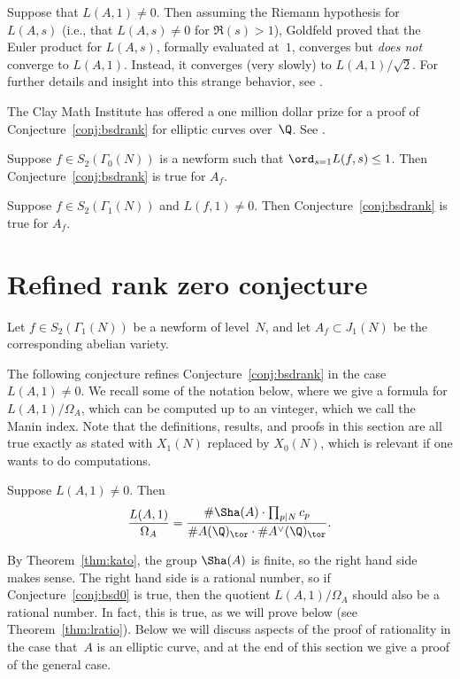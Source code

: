 \documentclass{report}
\begin{document}
\begin{remark}
  Suppose that $L(A,1)\neq 0$.  Then assuming the Riemann hypothesis
  for $L(A,s)$ (i.e., that $L(A,s)\neq 0$ for $\Re(s)>1$), Goldfeld
  \cite{goldfeld:L1} proved that the Euler product for $L(A,s)$,
  formally evaluated at~$1$, converges but {\em does not} converge to
  $L(A,1)$.  Instead, it converges (very slowly) to $L(A,1)/\sqrt{2}$.
  For further details and insight into this strange behavior, see
  \cite{conrad:eulerprod}.
\end{remark}


\begin{remark}
  The Clay Math Institute has offered a one million dollar prize for a
  proof of Conjecture~\ref{conj:bsdrank} for elliptic curves
  over~$\Q$.  See \cite{wiles:cmi}.
\end{remark}

\begin{theorem}\label{thm:kolylog}
Suppose $f\in S_2(\Gamma_0(N))$ is a newform such that $\ord_{s=1} L(f,s) \leq 1$. Then
Conjecture~\ref{conj:bsdrank} is true for $A_f$.
\end{theorem}

\begin{theorem}[Kato]\label{thm:kato}
  Suppose $f\in S_2(\Gamma_1(N))$ and $L(f,1)\neq 0$.  Then
  Conjecture~\ref{conj:bsdrank} is true for $A_f$.
\end{theorem}

\section{Refined rank zero conjecture}
Let $f \in S_2(\Gamma_1(N))$ be a newform of level~$N$, and let
$A_f\subset J_1(N)$ be the corresponding abelian variety.

The following conjecture refines Conjecture~\ref{conj:bsdrank} in the
case $L(A,1)\neq 0$.  We recall some of the notation below, where we
give a formula for $L(A,1)/\Omega_A$, which can be computed up to an
vinteger, which we call the Manin index.  Note that the definitions,
results, and proofs in this section are all true exactly as stated
with $X_1(N)$ replaced by $X_0(N)$, which is relevant if one wants
to do computations.

\begin{conjecture}\label{conj:bsd0}
Suppose $L(A,1)\neq 0$.  Then
$$
  \frac{L(A,1)}{\Omega_A}  =
  \frac{\#\Sha(A)\cdot \prod_{p\mid N} c_p}{\#A(\Q)_{\tor}\cdot \#A^{\vee}(\Q)_{\tor}}.
$$
\end{conjecture}
By Theorem~\ref{thm:kato}, the group $\Sha(A)$ is finite, so the right
hand side makes sense.   The right hand side is a rational number, so if
Conjecture~\ref{conj:bsd0} is true, then the quotient $L(A,1)/\Omega_A$
should also be a rational number.  In fact, this is true, as we will prove
below (see Theorem~\ref{thm:lratio}).   Below we will discuss aspects of
the proof of rationality in the case that~$A$ is an elliptic curve, and
at the end of this section we give a proof of the general case.
\end{document}
